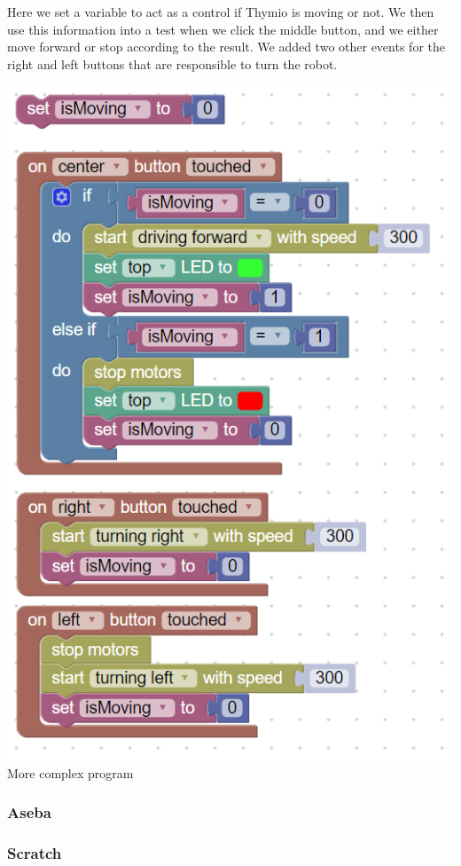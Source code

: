 \documentclass{scrartcl}
\begin{document}
Here we set a variable to act as a control if Thymio is moving or not. We then use this information into a test when we click the middle button, and we either move forward or stop according to the result. 
We added two other events for the right and left buttons that are responsible to turn the robot.
\begin{center}
  \includegraphics[scale=0.5]{./Blockly/advanced_program}\\
  More complex program
\end{center}

\subsubsection{Aseba}
\subsubsection{Scratch}
\end{document}
